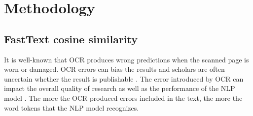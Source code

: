 \documentclass[11pt]{article}
\begin{document}
\section{Methodology} \label{methodology}


\subsection{FastText cosine similarity} \label{fasttext cosine similarity}
It is well-known that OCR produces wrong predictions when the scanned page is worn or damaged. OCR errors can bias the results \citep{chiron_impact_2017} and scholars are often uncertain whether the result is publishable \citep{traub_impact_2015}.
The error introduced by OCR can impact the overall quality of research as well as the performance of the NLP model \citep{jiang_impact_2021}. 
The more the OCR produced errors included in the text, the more the word tokens that the NLP model recognizes. 
\end{document}
